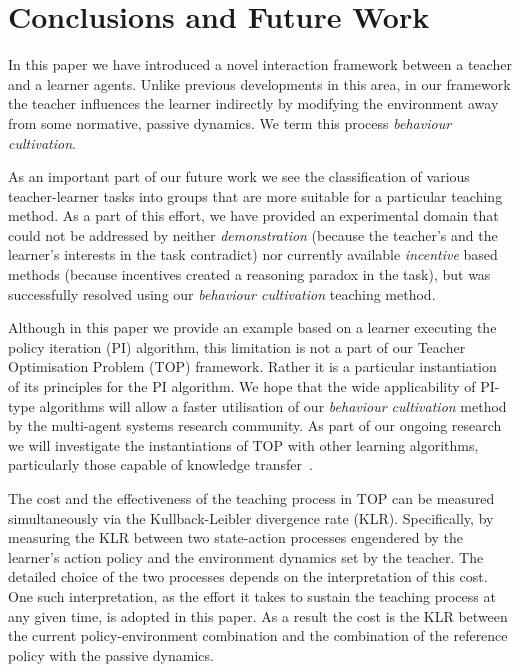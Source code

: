 \section{Conclusions and Future Work}\label{sec: future work}

In this paper we have introduced a novel interaction framework between
a teacher and a learner agents. Unlike previous developments in this
area, in our framework the teacher influences the learner indirectly by
modifying the environment away from some normative, passive
dynamics. We term this process {\em behaviour cultivation}.

As an important part of our future work we see the classification of
various teacher-learner tasks into groups that are more suitable for a
particular teaching method. As a part of this effort, we have provided
an experimental domain that could not be addressed by neither {\em
  demonstration} (because the teacher's and the learner's interests in
the task contradict) nor currently available {\em incentive} based
methods (because incentives created a reasoning paradox in the task),
but was successfully resolved using our {\em behaviour cultivation}
teaching method.

Although in this paper we provide an example based on a learner
executing the policy iteration (PI) algorithm, this limitation is not
a part of our Teacher Optimisation Problem (TOP) framework. Rather it
is a particular instantiation of its principles for the PI
algorithm. We hope that the wide applicability of PI-type algorithms
will allow a faster utilisation of our {\em behaviour cultivation}
method by the multi-agent systems research community. As part of our
ongoing research we will investigate the instantiations of TOP with
other learning algorithms, particularly those capable of knowledge
transfer~\cite{taylor_stone_2009,taylor_PhD_2008}.

The cost and the effectiveness of the teaching process in TOP can be
measured simultaneously via the Kullback-Leibler divergence rate
(KLR). Specifically, by measuring the KLR between two state-action
processes engendered by the learner's action policy and the
environment dynamics set by the teacher. The detailed choice of the
two processes depends on the interpretation of this cost. One such
interpretation, as the effort it takes to sustain the teaching process
at any given time, is adopted in this paper. As a result the cost is
the KLR between the current policy-environment combination and the
combination of the reference policy with the passive dynamics.


